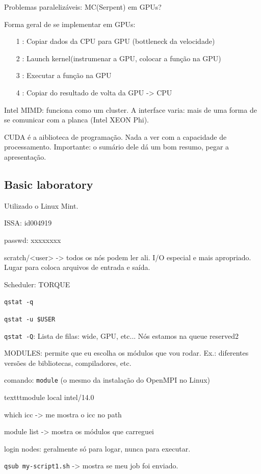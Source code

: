 \documentclass[12pt]{report} %
\begin{document}
Problemas paralelizáveis: MC(Serpent) em GPUs?

Forma geral de se implementar em GPUs:
\begin{itemize}
	\item[1]: Copiar dados da CPU para GPU (bottleneck da velocidade)
	\item[2]: Launch kernel(instrumenar a GPU, colocar a função na GPU)
	\item[3]: Executar a função na GPU
	\item[4]: Copiar do resultado de volta da GPU -> CPU
\end{itemize}

Intel MIMD: funciona como um cluster. A interface varia: mais de uma forma de se comunicar com a planca (Intel XEON Phi).

CUDA é a aiblioteca de programação. Nada a ver com a capacidade de processamento. 
Importante: o sumário dele dá um bom resumo, pegar a apresentação.

\subsection*{Basic laboratory}

Utilizado o Linux Mint.

ISSA: id004919

passwd: xxxxxxxx

scratch/<user> -> todos os nós podem ler ali. I/O especial e mais apropriado. Lugar para coloca arquivos de entrada e saída.

Scheduler: TORQUE

\texttt{qstat -q}

\texttt{qstat -u \$USER}

\texttt{qstat -Q}: Lista de filas: wide, GPU, etc... Nós estamos na queue reserved2


MODULES: permite que eu escolha os módulos que vou rodar. Ex.: diferentes versões de bibliotecas, compiladores, etc.

comando: \texttt{module} (o mesmo da instalação do OpenMPI no Linux)

texttt{module local intel/14.0}

which icc -> me mostra o icc no path

module list -> mostra os módulos que carreguei

login nodes: geralmente só para logar, nunca para executar.

\texttt{qsub my-script1.sh} -> mostra se meu job foi enviado.
\end{document}
